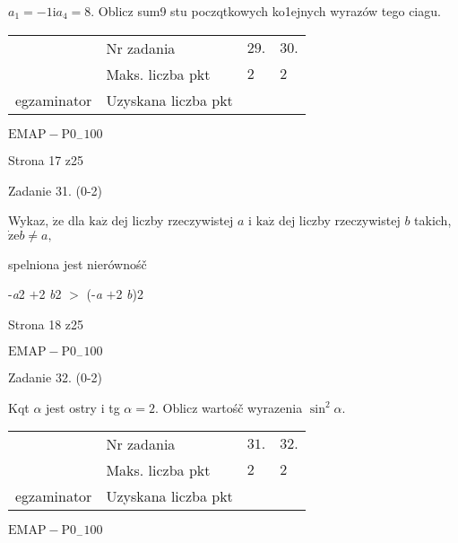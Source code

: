 \documentclass[a4paper,12pt]{article}
\begin{document}
$a_{1}=-1 \mathrm{i} a_{4}=8$. Oblicz sum9 stu poczqtkowych ko1ejnych wyrazów tego ciagu.
\begin{center}
\begin{tabular}{|l|l|l|l|}
\cline{2-4}
&	\multicolumn{1}{|l|}{Nr zadania}&	\multicolumn{1}{|l|}{$29.$}&	\multicolumn{1}{|l|}{ $30.$}	\\
\cline{2-4}
&	\multicolumn{1}{|l|}{Maks. liczba pkt}&	\multicolumn{1}{|l|}{$2$}&	\multicolumn{1}{|l|}{ $2$}	\\
\cline{2-4}
\multicolumn{1}{|l|}{egzaminator}&	\multicolumn{1}{|l|}{Uzyskana liczba pkt}&	\multicolumn{1}{|l|}{}&	\multicolumn{1}{|l|}{}	\\
\hline
\end{tabular}

\end{center}
$\mathrm{E}\mathrm{M}\mathrm{A}\mathrm{P}-\mathrm{P}0_{-}100$

Strona 17 z25





Zadanie 31. (0-2)

Wykaz, $\dot{\mathrm{z}}\mathrm{e}$ dla $\mathrm{k}\mathrm{a}\dot{\mathrm{z}}$ dej liczby rzeczywistej $a$ i $\mathrm{k}\mathrm{a}\dot{\mathrm{z}}$ dej liczby rzeczywistej $b$ takich, $\dot{\mathrm{z}}\mathrm{e} b\neq a,$

spelniona jest nierównośč

-{\it a}2 $+$2 {\it b}2 $>$ (-{\it a} $+$2 {\it b})2

Strona 18 z25

$\mathrm{E}\mathrm{M}\mathrm{A}\mathrm{P}-\mathrm{P}0_{-}100$





Zadanie 32. (0-2)

Kqt $\alpha$ jest ostry i tg $\alpha=2$. Oblicz wartośč wyrazenia $\sin^{2}\alpha.$
\begin{center}
\begin{tabular}{|l|l|l|l|}
\cline{2-4}
&	\multicolumn{1}{|l|}{Nr zadania}&	\multicolumn{1}{|l|}{$31.$}&	\multicolumn{1}{|l|}{ $32.$}	\\
\cline{2-4}
&	\multicolumn{1}{|l|}{Maks. liczba pkt}&	\multicolumn{1}{|l|}{$2$}&	\multicolumn{1}{|l|}{ $2$}	\\
\cline{2-4}
\multicolumn{1}{|l|}{egzaminator}&	\multicolumn{1}{|l|}{Uzyskana liczba pkt}&	\multicolumn{1}{|l|}{}&	\multicolumn{1}{|l|}{}	\\
\hline
\end{tabular}

\end{center}
$\mathrm{E}\mathrm{M}\mathrm{A}\mathrm{P}-\mathrm{P}0_{-}100$
\end{document}
